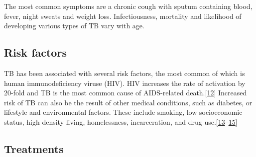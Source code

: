 \documentclass[11pt,twoside]{bristolthesis}
\begin{document}
  The most common symptoms are a chronic cough with sputum containing blood, fever, night sweats and weight loss. Infectiousness, mortality and likelihood of developing various types of TB vary with age.
  
  \hypertarget{risk-factors}{%
  \subsection{Risk factors}\label{risk-factors}}
  
  TB has been associated with several risk factors, the most common of which is human immunodeficiency viruse (HIV). HIV increases the rate of activation by 20-fold and TB is the most common cause of AIDS-related death.{[}\protect\hyperlink{ref-Rottenberg2012}{12}{]} Increased risk of TB can also be the result of other medical conditions, such as diabetes, or lifestyle and environmental factors. These include smoking, low socioeconomic status, high density living, homelessness, incarceration, and drug use.{[}\protect\hyperlink{ref-Bhatti1995}{13}--\protect\hyperlink{ref-Story2007}{15}{]}
  
  \hypertarget{treatments}{%
  \subsection{Treatments}\label{treatments}}
  
\end{document}
